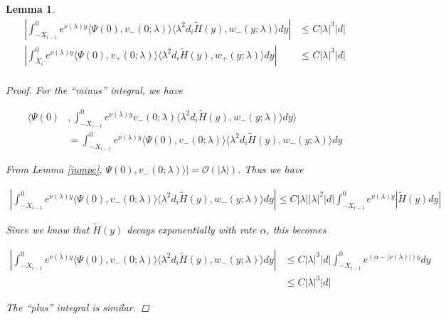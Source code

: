 \documentclass[12pt]{article}
\newtheorem{lemma}{Lemma}
\begin{document}
\begin{lemma}

\begin{align*}
\left| \int_{-X_{i-1}}^0
e^{\nu(\lambda)y} \langle \Psi(0), v_-(0; \lambda) \rangle \langle \lambda^2 d_i \tilde{H}(y), w_-(y; \lambda) \rangle dy \right| &\leq C |\lambda|^3 |d| \\
\left| \int_{X_i}^0
e^{\nu(\lambda)y} \langle \Psi(0), v_+(0; \lambda) \rangle \langle \lambda^2 d_i \tilde{H}(y), w_+(y; \lambda) \rangle dy \right| &\leq C |\lambda|^3 |d| \\
\end{align*}

\begin{proof}

For the ``minus'' integral, we have

\begin{align*}
\langle \Psi(0) &, \int_{-X_{i-1}}^0
e^{\nu(\lambda)y} v_-(0; \lambda) \langle \lambda^2 d_i \tilde{H}(y), w_-(y; \lambda) \rangle dy \rangle \\
&= \int_{-X_{i-1}}^0
e^{\nu(\lambda)y} \langle \Psi(0), v_-(0; \lambda) \rangle \langle \lambda^2 d_i \tilde{H}(y), w_-(y; \lambda) \rangle dy 
\end{align*}

From Lemma \ref{jumpc}, $\Psi(0), v_-(0; \lambda) \rangle| = \mathcal{O}(|\lambda|)$. Thus we have

\begin{align*}
\left|  \int_{-X_{i-1}}^0
e^{\nu(\lambda)y} \langle \Psi(0), v_-(0; \lambda) \rangle \langle \lambda^2 d_i \tilde{H}(y), w_-(y; \lambda) \rangle dy \right| \leq C |\lambda| |\lambda|^2 |d| 
\int_{-X_{i-1}}^0 e^{\nu(\lambda)y} |\tilde{H}(y) dy|
\end{align*}

Since we know that $\tilde{H}(y)$ decays exponentially with rate $\alpha$, this becomes

\begin{align*}
\left|  \int_{-X_{i-1}}^0
e^{\nu(\lambda)y} \langle \Psi(0), v_-(0; \lambda) \rangle \langle \lambda^2 d_i \tilde{H}(y), w_-(y; \lambda) \rangle dy \right| &\leq C |\lambda|^3 |d| 
\int_{-X_{i-1}}^0 e^{(\alpha - |\nu(\lambda)|)y} dy \\
&\leq C |\lambda|^3 |d|
\end{align*}

The ``plus'' integral is similar.

\end{proof} 
\end{lemma}
\end{document}
